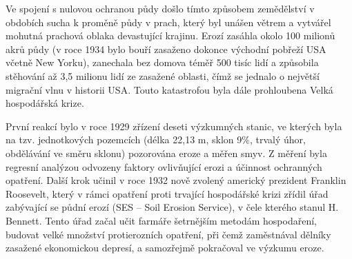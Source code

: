 Ve spojení s nulovou ochranou půdy došlo tímto způsobem zemědělství v obdobích sucha k proměně půdy v prach, který byl unášen větrem a vytvářel mohutná prachová oblaka devastující krajinu. Erozí zasáhla okolo 100 milionů akrů půdy (v roce 1934 bylo bouří zasaženo dokonce východní pobřeží USA včetně New Yorku), zanechala bez domova téměř 500 tisíc lidí a způsobila stěhování až 3,5 milionu lidí ze zasažené oblasti, čímž se jednalo o největší migrační vlnu v historii USA. Touto katastrofou byla dále prohloubena Velká hospodářská krize.

První reakcí bylo v roce 1929 zřízení deseti výzkumných stanic, ve kterých byla na tzv. jednotkových pozemcích (délka 22,13 m, sklon 9$\%$, trvalý úhor, obdělávání ve směru sklonu) pozorována eroze a měřen smyv. Z měření byla regresní analýzou odvozeny faktory ovlivňující erozi a účinnost ochranných opatření. Další krok učinil v roce 1932 nově zvolený americký prezident Franklin Roosevelt, který v rámci opatření proti trvající hospodářské krizi zřídil úřad zabývající se půdní erozí (SES – Soil Erosion Service), v čele kterého stanul H. Bennett. Tento úřad začal učit farmáře šetrnějším metodám hospodaření, budovat velké množství protierozních opatření, při čemž zaměstnával dělníky zasažené ekonomickou depresí, a samozřejmě pokračoval ve výzkumu eroze.\cite{Bonnifield1979}\cite{Egan2006}

